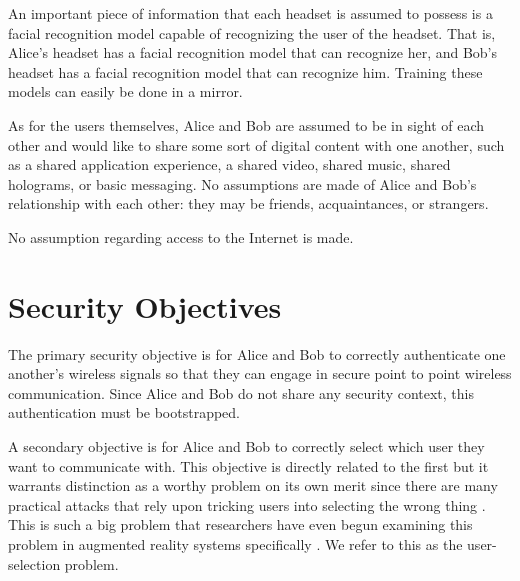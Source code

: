 \documentclass[12pt]{report}
\begin{document}
An important piece of information that each headset is assumed to possess is a facial recognition model capable of recognizing the user of the headset. That is, Alice's headset has a facial recognition model that can recognize her, and Bob's headset has a facial recognition model that can recognize him. Training these models can easily be done in a mirror. \par

As for the users themselves, Alice and Bob are assumed to be in sight of each other and would like to share some sort of digital content with one another, such as a shared application experience, a shared video, shared music, shared holograms, or basic messaging. No assumptions are made of Alice and Bob's relationship with each other: they may be friends, acquaintances, or strangers. \par

No assumption regarding access to the Internet is made. \par

\section{Security Objectives}
The primary security objective is for Alice and Bob to correctly authenticate one another's wireless signals so that they can engage in secure point to point wireless communication. Since Alice and Bob do not share any security context, this authentication must be bootstrapped. \par

A secondary objective is for Alice and Bob to correctly select which user they want to communicate with. This objective is directly related to the first but it warrants distinction as a worthy problem on its own merit since there are many practical attacks that rely upon tricking users into selecting the wrong thing \cite{PairingInterfaceConstrainedRushingSaxena2009,WhyPhishingWorksDhamija2006}. This is such a big problem that researchers have even begun examining this problem in augmented reality systems specifically \cite{SecurityAndPrivacyForARRoesner2014}. We refer to this as the user-selection problem. \par
\end{document}
